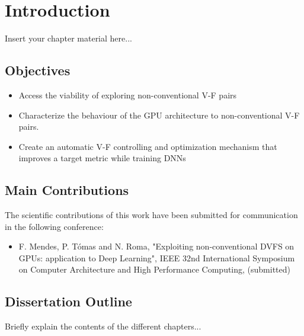
\chapter{Introduction}
\label{chapter:introduction}

Insert your chapter material here...




\section{Objectives}
\label{section:objectives}

\begin{itemize}
\item Access the viability of exploring non-conventional V-F pairs
\item Characterize the behaviour of the GPU architecture to non-conventional V-F pairs.
\item Create an automatic V-F controlling and optimization mechanism that improves a target metric while training DNNs
\end{itemize}


\section{Main Contributions}
\label{section:main_contri}

The scientiﬁc contributions of this work have been submitted for communication in the following conference:

\begin{itemize}
    \item F. Mendes, P. Tómas and N. Roma, "Exploiting non-conventional DVFS on GPUs: application to Deep Learning", IEEE 32nd International Symposium on Computer Architecture and High Performance Computing, (submitted)
\end{itemize}


\section{Dissertation Outline}
\label{section:outline}

Briefly explain the contents of the different chapters...

